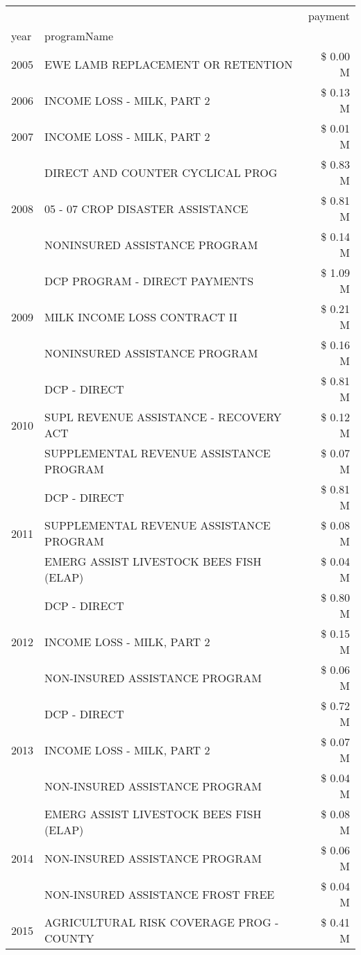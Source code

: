 \begin{tabular}{llr}
\toprule
 &  & payment \\
year & programName &  \\
\midrule
2005 & EWE LAMB REPLACEMENT OR RETENTION & \$ 0.00 M \\
\cline{1-3}
2006 & INCOME LOSS - MILK, PART 2 & \$ 0.13 M \\
\cline{1-3}
2007 & INCOME LOSS - MILK, PART 2 & \$ 0.01 M \\
\cline{1-3}
\multirow[t]{3}{*}{2008} & DIRECT AND COUNTER CYCLICAL PROG & \$ 0.83 M \\
 & 05 - 07 CROP DISASTER ASSISTANCE & \$ 0.81 M \\
 & NONINSURED ASSISTANCE PROGRAM & \$ 0.14 M \\
\cline{1-3}
\multirow[t]{3}{*}{2009} & DCP PROGRAM - DIRECT PAYMENTS & \$ 1.09 M \\
 & MILK INCOME LOSS CONTRACT II & \$ 0.21 M \\
 & NONINSURED ASSISTANCE PROGRAM & \$ 0.16 M \\
\cline{1-3}
\multirow[t]{3}{*}{2010} & DCP - DIRECT & \$ 0.81 M \\
 & SUPL REVENUE ASSISTANCE - RECOVERY ACT & \$ 0.12 M \\
 & SUPPLEMENTAL REVENUE ASSISTANCE PROGRAM & \$ 0.07 M \\
\cline{1-3}
\multirow[t]{3}{*}{2011} & DCP - DIRECT & \$ 0.81 M \\
 & SUPPLEMENTAL REVENUE ASSISTANCE PROGRAM & \$ 0.08 M \\
 & EMERG ASSIST LIVESTOCK BEES FISH (ELAP) & \$ 0.04 M \\
\cline{1-3}
\multirow[t]{3}{*}{2012} & DCP - DIRECT & \$ 0.80 M \\
 & INCOME LOSS - MILK, PART 2 & \$ 0.15 M \\
 & NON-INSURED ASSISTANCE PROGRAM & \$ 0.06 M \\
\cline{1-3}
\multirow[t]{3}{*}{2013} & DCP - DIRECT & \$ 0.72 M \\
 & INCOME LOSS - MILK, PART 2 & \$ 0.07 M \\
 & NON-INSURED ASSISTANCE PROGRAM & \$ 0.04 M \\
\cline{1-3}
\multirow[t]{3}{*}{2014} & EMERG ASSIST LIVESTOCK BEES FISH (ELAP) & \$ 0.08 M \\
 & NON-INSURED ASSISTANCE PROGRAM & \$ 0.06 M \\
 & NON-INSURED ASSISTANCE FROST FREE & \$ 0.04 M \\
\cline{1-3}
\multirow[t]{3}{*}{2015} & AGRICULTURAL RISK COVERAGE PROG - COUNTY & \$ 0.41 M \\

\end{tabular}

